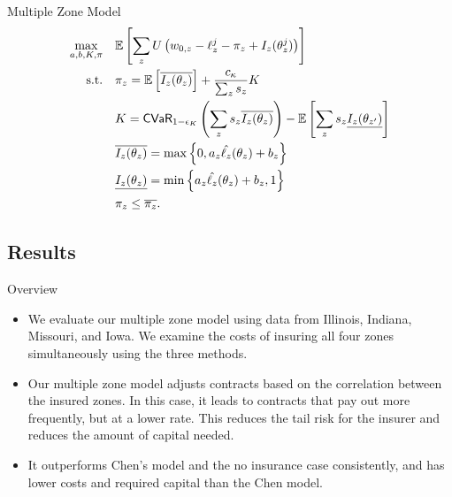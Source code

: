 \documentclass{beamer}
\begin{document}
    \begin{frame}{Multiple Zone Model}
        \begin{align}
            \max_{a,b,K,\pi} &\quad \mathbb{E}\left [ \sum_z U\left ( w_{0,z} -\ell_z^j -\pi_z + I_z(\theta^j_z) \right ) \right ]\label{eq-33}\\
            \text{s.t.} &\quad \pi_z  = \mathbb{E}\left [ \overline{I_z(\theta_z)} \right ] + \frac{c_{\kappa}}{\sum_z s_z}  K\\
            &\quad K = {\sf CVaR}_{1-\epsilon_K} \left ( \sum_z s_z\overline{I_z(\theta_z)} \right ) - \mathbb{E}\left [ \sum_{z} s_{z}\underline{I_{z}(\theta_{z'})} \right ] \label{eq-32}\\
            &\quad \overline{I_z(\theta_z)} = \max \left \{0,a_z\hat{\ell_z}(\theta_z) + b_z \right \} \nonumber\\
            &\quad\underline{I_z(\theta_z)} = \min \left \{a_z\hat{\ell_z}(\theta_z)+b_z,1 \right \} \nonumber\\
            &\quad\pi_z \leq \overline{\pi_z} \nonumber.
          \end{align}
    \end{frame}

\subsection{Results}
\begin{frame}{Overview}
    \begin{itemize}
        \item We evaluate our multiple zone model using data from Illinois, Indiana, Missouri, and Iowa. We examine the costs of insuring all four zones simultaneously using the three methods. 
        \item Our multiple zone model adjusts contracts based on the correlation between the insured zones. In this case, it leads to contracts that pay out more frequently, but at a lower rate. This reduces the tail risk for the insurer and reduces the amount of capital needed. 
        \item It outperforms Chen's model and the no insurance case consistently, and has lower costs and required capital than the Chen model. 
    \end{itemize}
\end{frame}
\end{document}
